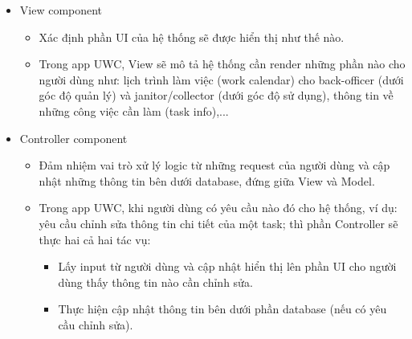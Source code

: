 \documentclass[a4paper]{article}
\begin{document}
\begin{itemize}
\begin{itemize}
        \item View component
        \begin{itemize}
            \item Xác định phần UI của hệ thống sẽ được hiển thị như thế nào. 
            \item Trong app UWC, View sẽ mô tả hệ thống cần render những phần nào cho người dùng như: lịch trình làm việc (work calendar) cho back-officer (dưới góc độ quản lý) và janitor/collector (dưới góc độ sử dụng), thông tin về những công việc cần làm (task info),...
        \end{itemize}
        
        \item Controller component
        \begin{itemize}
            \item Đảm nhiệm vai trò xử lý logic từ những request của người dùng và cập nhật những thông tin bên dưới database, đứng giữa View và Model.
            \item Trong app UWC, khi người dùng có yêu cầu nào đó cho hệ thống, ví dụ: yêu cầu chỉnh sửa thông tin chi tiết của một task; thì phần Controller sẽ thực hai cả hai tác vụ:
            \begin{itemize}
                \item Lấy input từ người dùng và cập nhật hiển thị lên phần UI cho người dùng thấy thông tin nào cần chỉnh sửa.
                \item Thực hiện cập nhật thông tin bên dưới phần database (nếu có yêu cầu chỉnh sửa).
            \end{itemize}
        \end{itemize}
        
    \end{itemize}
    

\end{itemize}
\end{document}
